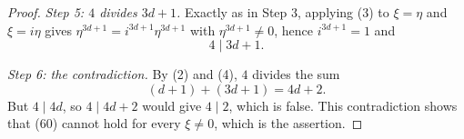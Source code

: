 \begin{proof}
\emph{Step 5: $4$ divides $3d+1$.}  Exactly as in Step 3, applying (3) to
$\xi=\eta$ and $\xi=i\eta$ gives
$\eta^{3d+1}=i^{3d+1}\eta^{3d+1}$ with $\eta^{3d+1}\neq0$, hence $i^{3d+1}=1$
and
\begin{equation}\tag{4}
  4\mid 3d+1 .
\end{equation}

\emph{Step 6: the contradiction.}  By (2) and (4), $4$ divides the sum
\[
  (d+1)+(3d+1)=4d+2 .
\]
But $4\mid 4d$, so $4\mid 4d+2$ would give $4\mid2$, which is false.  This
contradiction shows that (60) cannot hold for every $\xi\neq0$, which is the
assertion.
\end{proof}
